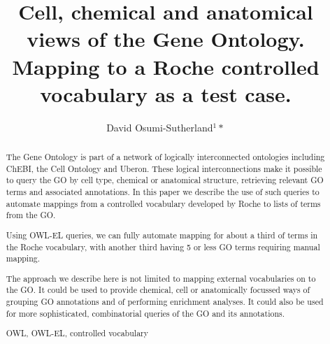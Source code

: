 \documentclass[runningheads,a4paper]{llncs}
\newcommand{\keywords}[1]{\par\addvspace\baselineskip
\noindent\keywordname\enspace\ignorespaces#1}
\begin{document}
\mainmatter  %

\title{Cell, chemical and anatomical views of the Gene Ontology.  Mapping to a Roche controlled vocabulary as a test case.}


%
%
\author{David Osumi-Sutherland$^1*$}  %

%



%
%

\toctitle{}
\tocauthor{}
\maketitle


\begin{abstract}

The Gene Ontology is part of a network of logically interconnected ontologies including ChEBI, the Cell Ontology and Uberon.  These logical interconnections make it possible to query the GO by cell type, chemical or anatomical structure, retrieving relevant GO terms and associated annotations.  In this paper we describe the use of such queries to automate mappings from a controlled vocabulary developed by Roche to lists of terms from the GO.

Using OWL-EL queries, we can fully automate mapping for about a third of terms in the Roche vocabulary, with another third having 5 or less GO terms requiring manual mapping.

The approach we describe here is not limited to mapping external vocabularies on to the GO. It could be used to provide chemical, cell or anatomically focussed ways of grouping GO annotations and of performing enrichment analyses. It could also be used for more sophisticated, combinatorial queries of the GO and its annotations.


\keywords{OWL, OWL-EL, controlled vocabulary}
\end{abstract}
\end{document}

